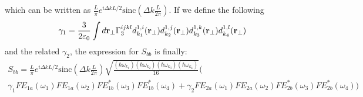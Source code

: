 which can be written as $\frac{L}{\pi}e^{i\Delta k L/2} \text{sinc}\left(\Delta k \frac{L}{2\pi}\right)$. If we define the following
\begin{equation}\gamma_1 = \frac{3}{2\varepsilon_0}\int d\mathbf{r}_\perp \Gamma^{ijkl}_3d^{1,i}_{k_1}(\mathbf{r}_{\perp})d^{1,j}_{k_2}(\mathbf{r}_{\perp})d^{1,k}_{k_3}(\mathbf{r}_{\perp})d^{1,l}_{k_4}(\mathbf{r}_{\perp})\end{equation}
and the related $\gamma_2$, the expression for $S_{bb}$ is finally:
\begin{multline}\label{sbbfinal} S_{bb} = \frac{L}{\pi}e^{i\Delta k L/2} \text{sinc}\left(\Delta k \frac{L}{2\pi}\right) \sqrt{\frac{(\hbar\omega_{k_1})(\hbar\omega_{k_2})(\hbar\omega_{k_3})(\hbar\omega_{k_4})}{16}}\Bigg(\\ \gamma_1 FE_{1a}(\omega_1)FE_{1a}(\omega_2)FE^*_{1b}(\omega_3)FE^*_{1b}(\omega_4) +\gamma_2 FE_{2a}(\omega_1)FE_{2a}(\omega_2)FE^*_{2b}(\omega_3)FE^*_{2b}(\omega_4)\Bigg)\end{multline}




